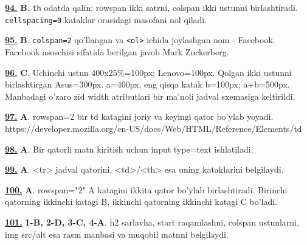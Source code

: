 \documentclass[10pt,a4paper,oneside]{article}
\begin{document}
\par\vspace{3mm}
\noindent\hyperlink{q94}{\textbf{94.}} \textbf{B}.  \texttt{th} odatda qalin; rowspan ikki satrni, colspan ikki ustunni birlashtiradi. \texttt{cellspacing=0} kataklar orasidagi masofani nol qiladi.
\par\vspace{3mm}
\noindent\hyperlink{q95}{\textbf{95.}} \textbf{B}.  \texttt{colspan=2} qo'llangan va \texttt{\textless{}ol\textgreater{}} ichida joylashgan nom - Facebook. Facebook asoschisi sifatida berilgan javob Mark Zuckerberg.
\par\vspace{3mm}
\noindent\hyperlink{q96}{\textbf{96.}} \textbf{C}.  Uchinchi ustun 400x25\%=100px; Lenovo=100px. Qolgan ikki ustunni birlashtirgan Asus=300px. a=400px, eng qisqa katak b=100px; a+b=500px. Manbadagi o'zaro zid width atributlari bir ma'noli jadval sxemasiga keltirildi.
\par\vspace{3mm}
\noindent\hyperlink{q97}{\textbf{97.}} \textbf{A}.  rowspan=2 bir td katagini joriy va keyingi qator bo'ylab yoyadi. https://developer.mozilla.org/en-US/docs/Web/HTML/Reference/Elements/td
\par\vspace{3mm}
\noindent\hyperlink{q98}{\textbf{98.}} \textbf{A}.  Bir qatorli matn kiritish uchun input type=text ishlatiladi.
\par\vspace{3mm}
\noindent\hyperlink{q99}{\textbf{99.}} \textbf{A}.  \textless{}tr\textgreater{} jadval qatorini, \textless{}td\textgreater{}/\textless{}th\textgreater{} esa uning kataklarini belgilaydi.
\par\vspace{3mm}
\noindent\hyperlink{q100}{\textbf{100.}} \textbf{A}.  rowspan="2" A katagini ikkita qator bo'ylab birlashtiradi. Birinchi qatorning ikkinchi katagi B, ikkinchi qatorning ikkinchi katagi C bo'ladi.
\par\vspace{3mm}
\noindent\hyperlink{q101}{\textbf{101.}} \textbf{1-B, 2-D, 3-C, 4-A}.  h2 sarlavha, start raqamlashni, colspan ustunlarni, img src/alt esa rasm manbasi va muqobil matnni belgilaydi.
\par\vspace{3mm}
\end{document}
